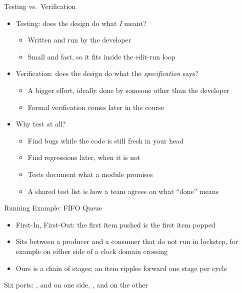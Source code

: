 \begin{frame}{Testing vs.\ Verification}
	\begin{itemize}
		\item Testing: does the design do what \emph{I} meant?
		\begin{itemize}
			\item Written and run by the developer
			\item Small and fast, so it fits inside the edit-run loop
		\end{itemize}
		\pause
		\item Verification: does the design do what the \emph{specification} says?
		\begin{itemize}
			\item A bigger effort, ideally done by someone other than the developer
			\item Formal verification comes later in the course
		\end{itemize}
		\pause
		\item Why test at all?
		\begin{itemize}
			\item Find bugs while the code is still fresh in your head
			\item Find regressions later, when it is not
			\item Tests document what a module promises
			\item A shared test list is how a team agrees on what ``done'' means
		\end{itemize}
	\end{itemize}
\end{frame}

\begin{frame}{Running Example: FIFO Queue}
	\begin{itemize}
		\item First-In, First-Out: the first item pushed is the first item popped
		\item Sits between a producer and a consumer that do not run in lockstep,
		      for example on either side of a clock domain crossing
		\item Ours is a chain of stages; an item ripples forward one stage per cycle
	\end{itemize}
	\vspace{1em}
	\begin{center}
	\end{center}
	\pause
	\vspace{1em}
	Six ports: ,  and  on one side, ,  and  on the other
\end{frame}

